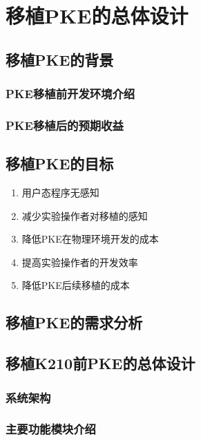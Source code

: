 
\chapter{移植PKE的总体设计}

\section{移植PKE的背景}

\subsection{PKE移植前开发环境介绍}

\subsection{PKE移植后的预期收益}

\section{移植PKE的目标}

\begin{enumerate}
    \item 用户态程序无感知
    \item 减少实验操作者对移植的感知
    \item 降低PKE在物理环境开发的成本
    \item 提高实验操作者的开发效率
    \item 降低PKE后续移植的成本
\end{enumerate}

\section{移植PKE的需求分析}

\section{移植K210前PKE的总体设计}

\subsection{系统架构}

\subsection{主要功能模块介绍}

